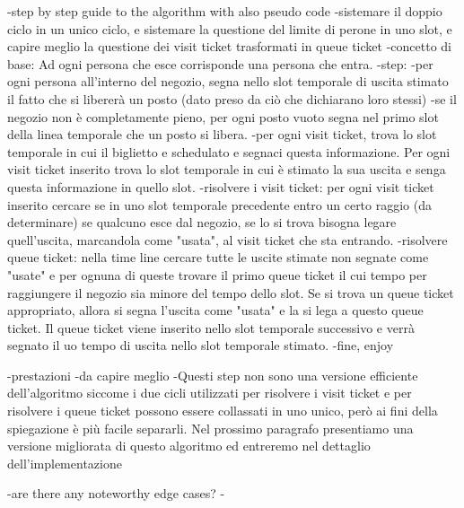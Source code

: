 -step by step guide to the algorithm with also pseudo code
    -sistemare il doppio ciclo in un unico ciclo, e sistemare la questione del limite di perone in uno slot, e capire meglio la questione dei visit ticket trasformati in queue ticket
    -concetto di base: Ad ogni persona che esce corrisponde una persona che entra.
    -step:
        -per ogni persona all'interno del negozio, segna nello slot temporale di uscita stimato il fatto che si libererà un posto (dato preso da ciò che dichiarano loro stessi)
        -se il negozio non è completamente pieno, per ogni posto vuoto segna nel primo slot della linea temporale che un posto si libera.
        -per ogni visit ticket, trova lo slot temporale in cui il biglietto e schedulato e segnaci questa informazione. Per ogni visit ticket inserito trova lo slot temporale in cui è stimato la sua uscita e senga questa informazione in quello slot.
        -risolvere i visit ticket: per ogni visit ticket inserito cercare se in uno slot temporale precedente entro un certo raggio (da determinare) se qualcuno esce dal negozio, se lo si trova bisogna legare quell'uscita, marcandola come "usata", al visit ticket che sta entrando.
        -risolvere queue ticket: nella time line cercare tutte le uscite stimate non segnate come "usate" e per ognuna di queste trovare il primo queue ticket il cui tempo per raggiungere il negozio sia minore del tempo dello slot. Se si trova un queue ticket appropriato, allora si segna l'uscita come "usata" e la si lega a questo queue ticket. Il queue ticket viene inserito nello slot temporale successivo e verrà segnato il uo tempo di uscita nello slot temporale stimato.
        -fine, enjoy

-prestazioni
    -da capire meglio
    -Questi step non sono una versione efficiente dell'algoritmo siccome i due cicli utilizzati per risolvere i visit ticket e per risolvere i queue ticket possono essere collassati in uno unico, però ai fini della spiegazione è più facile separarli. Nel prossimo paragrafo presentiamo una versione migliorata di questo algoritmo ed entreremo nel dettaglio dell'implementazione

-are there any noteworthy edge cases?
    -